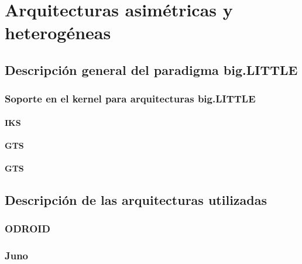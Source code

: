 \cleardoublepage

\chapter{Arquitecturas asimétricas y heterogéneas}
\label{ch:chapter2}

\section{Descripción general del paradigma big.LITTLE}

\subsection{Soporte en el kernel para arquitecturas big.LITTLE}

\subsubsection{IKS}

\subsubsection{GTS}

\subsubsection{GTS}

\section{Descripción de las arquitecturas utilizadas}

\subsection{ODROID}

\subsection{Juno}
